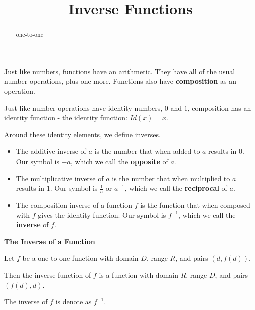 \documentclass{ximera}
\title{Inverse Functions}
\begin{document}
\begin{abstract}
one-to-one
\end{abstract}
\maketitle





Just like numbers, functions have an arithmetic.  They have all of the usual number operations, plus one more.  Functions also have \textbf{\textcolor{purple!85!blue}{composition}} as an operation.

Just like number operations have identity numbers, $0$ and $1$, composition has an identity function - the identity function: $Id(x) = x$.




Around these identity elements, we define inverses.






\begin{itemize}
\item The additive inverse of $a$ is the number that when added to $a$ results in $0$.  Our symbol is $-a$, which we call the \textbf{\textcolor{blue!55!black}{opposite}} of $a$.
\item The multiplicative inverse of $a$ is the number that when multiplied to $a$ results in $1$.  Our symbol is $\frac{1}{a}$ or $a^{-1}$, which we call the \textbf{\textcolor{blue!55!black}{reciprocal}} of $a$.
\item The composition inverse of a function $f$ is the function that when composed with $f$ gives the identity function. Our symbol is $f^{-1}$, which we call the \textbf{\textcolor{blue!55!black}{inverse}} of $f$.
\end{itemize}





\begin{definition} \textbf{\textcolor{green!50!black}{The Inverse of a Function}} 


Let $f$ be a one-to-one function with domain $D$, range $R$, and pairs $(d, f(d))$.

Then the inverse function of $f$ is a function with domain $R$, range $D$, and pairs $(f(d), d)$.


The inverse of $f$ is denote as $f^{-1}$.

\end{definition}
\end{document}
